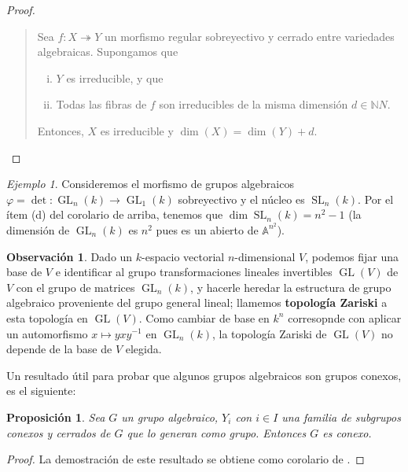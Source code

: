 \documentclass[spanish,10pt]{amsart}
\newtheorem{proposition}[theorem]{Proposición}
\theoremstyle{definition}
\newtheorem{obs}[theorem]{Observación}
\theoremstyle{remark}
\newtheorem{example}[theorem]{Ejemplo}
\numberwithin{equation}{section}
\newcommand{\afine}[1]{\mathbb{A}^{#1}}
\newcommand{\naturals}{\mathbb{N}}
\begin{document}
\begin{proof}
\begin{enumerate}[(a)]
\begin{quote}
Sea $f : X \twoheadrightarrow Y$ un morfismo regular sobreyectivo y cerrado entre variedades algebraicas. Supongamos que
\begin{enumerate}[(i)]
\item $Y$ es irreducible, y que
\item Todas las fibras de $f$ son irreducibles de la misma dimensión $d \in \naturals N$.
\end{enumerate}
Entonces, $X$ es irreducible y $\dim (X) = \dim (Y) + d$.
\end{quote}
\end{enumerate}
\end{proof}

\begin{example}
Consideremos el morfismo de grupos algebraicos $\varphi = \det : \operatorname{GL}_n (k) \to \operatorname{GL}_{1} (k)$ sobreyectivo y el núcleo es $\operatorname{SL}_n (k)$. Por el ítem (d) del corolario de arriba, tenemos que $\dim \operatorname{SL}_n (k) = n^2 -1$ (la dimensión de $\operatorname{GL}_n (k)$ es $n^2$ pues es un abierto de $\afine{n^2}$).
\end{example}

\begin{obs}
Dado un $k$-espacio vectorial $n$-dimensional $V$, podemos fijar una base de $V$ e identificar al grupo transformaciones lineales invertibles $\operatorname{GL} (V)$ de $V$ con el grupo de matrices $\operatorname{GL}_n (k)$, y hacerle heredar la estructura de grupo algebraico proveniente del grupo general lineal; llamemos \textbf{topología Zariski} a esta topología en $\operatorname{GL}(V)$. Como cambiar de base en $k^n$ corresopnde con aplicar un automorfismo $x \mapsto y x y^{-1}$ en $\operatorname{GL}_n (k)$, la topología Zariski de $\operatorname{GL} (V)$ no depende de la base de $V$ elegida.
\end{obs}

Un resultado útil para probar que algunos grupos algebraicos son grupos conexos, es el siguiente:
\begin{proposition}\label{proposition:proposicion util para probar que un grupo algebraico es conexo}
Sea $G$ un grupo algebraico, $Y_i $ con $i \in I$ una familia de subgrupos conexos y cerrados de $G$ que lo generan como grupo. Entonces $G$ es conexo.
\end{proposition}
\begin{proof}
La demostración de este resultado se obtiene como corolario de \cite[Proposición \S 7.5.]{humphreys2012linearAlgebraicGroups}.
\end{proof}
\end{document}
